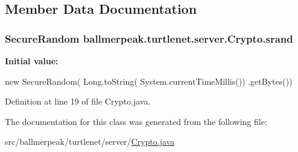 \subsection{Member Data Documentation}
\hypertarget{classballmerpeak_1_1turtlenet_1_1server_1_1Crypto_ad2ae6688f871ae46b7a5ae98b35d7000}{
\subsubsection[{srand}]{\setlength{\rightskip}{0pt plus 5cm}Secure\-Random ballmerpeak.\-turtlenet.\-server.\-Crypto.\-srand\hspace{0.3cm}{\ttfamily [static]}}}\label{classballmerpeak_1_1turtlenet_1_1server_1_1Crypto_ad2ae6688f871ae46b7a5ae98b35d7000}
{\bfseries Initial value\-:}
\begin{DoxyCode}
 \textcolor{keyword}{new} SecureRandom(
                                               Long.toString(
                                                   System.currentTimeMillis())
                                               .getBytes())
\end{DoxyCode}


Definition at line 19 of file Crypto.\-java.



The documentation for this class was generated from the following file\-:\begin{DoxyCompactItemize}
\item 
src/ballmerpeak/turtlenet/server/\hyperlink{Crypto_8java}{Crypto.\-java}\end{DoxyCompactItemize}
